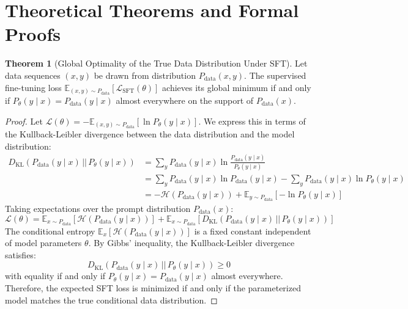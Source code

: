 \documentclass[11pt,a4paper]{article}
\theoremstyle{definition}
\newtheorem{theorem}{\textbf{Theorem}}[section]
\begin{document}
\section{Theoretical Theorems and Formal Proofs}

\begin{theorem}[Global Optimality of the True Data Distribution Under SFT]
Let data sequences $(x, y)$ be drawn from distribution $P_{\text{data}}(x, y)$. The supervised fine-tuning loss $\mathbb{E}_{(x, y) \sim P_{\text{data}}}[\mathcal{L}_{\text{SFT}}(\theta)]$ achieves its global minimum if and only if $P_\theta(y \mid x) = P_{\text{data}}(y \mid x)$ almost everywhere on the support of $P_{\text{data}}(x)$.
\end{theorem}

\begin{proof}
Let $\mathcal{L}(\theta) = -\mathbb{E}_{(x, y) \sim P_{\text{data}}}\left[ \ln P_\theta(y \mid x) \right]$.
We express this in terms of the Kullback-Leibler divergence between the data distribution and the model distribution:
{\boldmath
\begin{align}
D_{\text{KL}}\left( P_{\text{data}}(y \mid x) \,||\, P_\theta(y \mid x) \right) &= \sum_{y} P_{\text{data}}(y \mid x) \ln \frac{P_{\text{data}}(y \mid x)}{P_\theta(y \mid x)} \\
&= \sum_{y} P_{\text{data}}(y \mid x) \ln P_{\text{data}}(y \mid x) - \sum_{y} P_{\text{data}}(y \mid x) \ln P_\theta(y \mid x) \\
&= - \mathcal{H}(P_{\text{data}}(y \mid x)) + \mathbb{E}_{y \sim P_{\text{data}}}\left[ -\ln P_\theta(y \mid x) \right]
\end{align}
}
Taking expectations over the prompt distribution $P_{\text{data}}(x)$:
{\boldmath
\begin{equation}
\mathcal{L}(\theta) = \mathbb{E}_{x \sim P_{\text{data}}}\left[ \mathcal{H}(P_{\text{data}}(y \mid x)) \right] + \mathbb{E}_{x \sim P_{\text{data}}}\left[ D_{\text{KL}}\left( P_{\text{data}}(y \mid x) \,||\, P_\theta(y \mid x) \right) \right]
\end{equation}
}
The conditional entropy $\mathbb{E}_{x}[\mathcal{H}(P_{\text{data}}(y \mid x))]$ is a fixed constant independent of model parameters $\theta$.
By Gibbs' inequality, the Kullback-Leibler divergence satisfies:
{\boldmath
\begin{equation}
D_{\text{KL}}\left( P_{\text{data}}(y \mid x) \,||\, P_\theta(y \mid x) \right) \ge 0
\end{equation}
}
with equality if and only if $P_\theta(y \mid x) = P_{\text{data}}(y \mid x)$ almost everywhere.
Therefore, the expected SFT loss is minimized if and only if the parameterized model matches the true conditional data distribution.
\end{proof}
\end{document}
